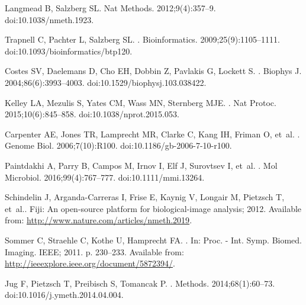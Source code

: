 \documentclass[10pt,letterpaper]{article}
\begin{document}
\begin{thebibliography}{10}
Langmead B, Salzberg SL.
\newblock Nat Methods. 2012;9(4):357--9.
\newblock doi:{10.1038/nmeth.1923}.

Trapnell C, Pachter L, Salzberg SL.
.
\newblock Bioinformatics. 2009;25(9):1105--1111.
\newblock doi:{10.1093/bioinformatics/btp120}.

Costes SV, Daelemans D, Cho EH, Dobbin Z, Pavlakis G, Lockett S.
.
\newblock Biophys J. 2004;86(6):3993--4003.
\newblock doi:{10.1529/biophysj.103.038422}.

Kelley LA, Mezulis S, Yates CM, Wass MN, Sternberg MJE.
.
\newblock Nat Protoc. 2015;10(6):845--858.
\newblock doi:{10.1038/nprot.2015.053}.

Carpenter AE, Jones TR, Lamprecht MR, Clarke C, Kang IH, Friman O, et~al.
.
\newblock Genome Biol. 2006;7(10):R100.
\newblock doi:{10.1186/gb-2006-7-10-r100}.

Paintdakhi A, Parry B, Campos M, Irnov I, Elf J, Surovtsev I, et~al.
.
\newblock Mol Microbiol. 2016;99(4):767--777.
\newblock doi:{10.1111/mmi.13264}.

Schindelin J, Arganda-Carreras I, Frise E, Kaynig V, Longair M, Pietzsch T,
  et~al.. {Fiji: An open-source platform for biological-image analysis}; 2012.
\newblock Available from: \url{http://www.nature.com/articles/nmeth.2019}.

Sommer C, Straehle C, Kothe U, Hamprecht FA.
.
\newblock In: Proc. - Int. Symp. Biomed. Imaging. IEEE; 2011. p. 230--233.
\newblock Available from: \url{http://ieeexplore.ieee.org/document/5872394/}.

Jug F, Pietzsch T, Preibisch S, Tomancak P.
.
\newblock Methods. 2014;68(1):60--73.
\newblock doi:{10.1016/j.ymeth.2014.04.004}.


\end{thebibliography}
\end{document}
